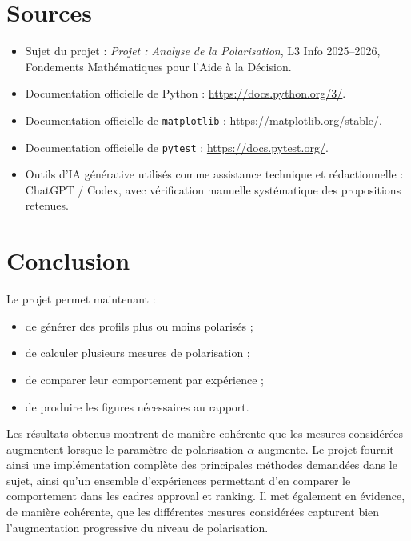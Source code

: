 \documentclass[11pt,a4paper]{article}
\begin{document}
\section{Sources}

\begin{itemize}[leftmargin=*]
    \item Sujet du projet : \emph{Projet : Analyse de la Polarisation}, L3 Info 2025--2026, Fondements Math\'ematiques pour l'Aide \`a la D\'ecision.
    \item Documentation officielle de Python : \url{https://docs.python.org/3/}.
    \item Documentation officielle de \texttt{matplotlib} : \url{https://matplotlib.org/stable/}.
    \item Documentation officielle de \texttt{pytest} : \url{https://docs.pytest.org/}.
    \item Outils d'IA g\'en\'erative utilis\'es comme assistance technique et r\'edactionnelle : ChatGPT / Codex, avec v\'erification manuelle syst\'ematique des propositions retenues.
\end{itemize}

\section{Conclusion}

Le projet permet maintenant :
\begin{itemize}[leftmargin=*]
    \item de g\'en\'erer des profils plus ou moins polaris\'es ;
    \item de calculer plusieurs mesures de polarisation ;
    \item de comparer leur comportement par exp\'erience ;
    \item de produire les figures n\'ecessaires au rapport.
\end{itemize}

Les r\'esultats obtenus montrent de mani\`ere coh\'erente que les mesures consid\'er\'ees augmentent lorsque le param\`etre de polarisation \(\alpha\) augmente. Le projet fournit ainsi une impl\'ementation compl\`ete des principales m\'ethodes demand\'ees dans le sujet, ainsi qu'un ensemble d'exp\'eriences permettant d'en comparer le comportement dans les cadres approval et ranking. Il met \'egalement en \'evidence, de mani\`ere coh\'erente, que les diff\'erentes mesures consid\'er\'ees capturent bien l'augmentation progressive du niveau de polarisation.
\end{document}
